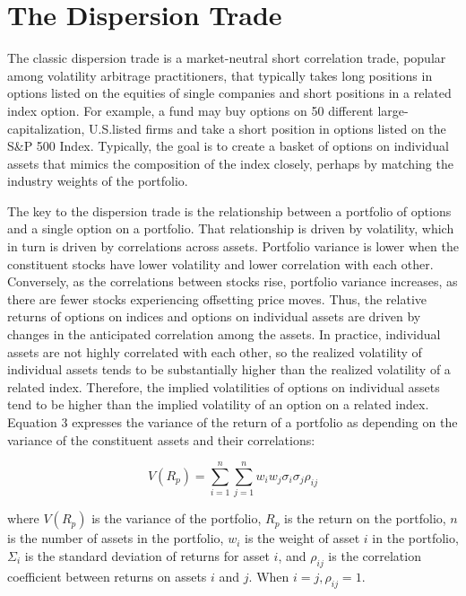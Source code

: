 \documentclass[11pt]{article}
\begin{document}
\section*{The Dispersion Trade}
The classic dispersion trade is a market-neutral short correlation trade, popular among volatility arbitrage practitioners, that typically takes long positions in options listed on the equities of single companies and short positions in a related index option. For example, a fund may buy options on 50 different large-capitalization, U.S.listed firms and take a short position in options listed on the S\&P 500 Index. Typically, the goal is to create a basket of options on individual assets that mimics the composition of the index closely, perhaps by matching the industry weights of the portfolio.

The key to the dispersion trade is the relationship between a portfolio of options and a single option on a portfolio. That relationship is driven by volatility, which in turn is driven by correlations across assets. Portfolio variance is lower when the constituent stocks have lower volatility and lower correlation with each other. Conversely, as the correlations between stocks rise, portfolio variance increases, as there are fewer stocks experiencing offsetting price moves. Thus, the relative returns of options on indices and options on individual assets are driven by changes in the anticipated correlation among the assets. In practice, individual assets are not highly correlated with each other, so the realized volatility of individual assets tends to be substantially higher than the realized volatility of a related index. Therefore, the implied volatilities of options on individual assets tend to be higher than the implied volatility of an option on a related index. Equation 3 expresses the variance of the return of a portfolio as depending on the variance of the constituent assets and their correlations:


\begin{equation*}
V\left(R_{p}\right)=\sum_{i=1}^{n} \sum_{j=1}^{n} w_{i} w_{j} \sigma_{i} \sigma_{j} \rho_{i j} \tag{3}
\end{equation*}


where $V\left(R_{p}\right)$ is the variance of the portfolio, $R_{p}$ is the return on the portfolio, $n$ is the number of assets in the portfolio, $w_{i}$ is the weight of asset $i$ in the portfolio, $\Sigma_{i}$ is the standard deviation of returns for asset $i$, and $\rho_{i j}$ is the correlation coefficient between returns on assets $i$ and $j$. When $i=j, \rho_{i j}=1$.
\end{document}
